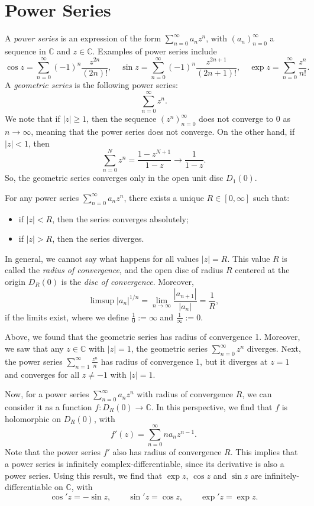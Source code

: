 \documentclass[a4paper, openany]{memoir}
\theoremstyle{definition}
\theoremstyle{plain}
\begin{document}
    \newpage

    \section{Power Series}
    A \emph{power series} is an expression of the form $\sum_{n=0}^\infty a_n z^n$, with $(a_n)_{n=0}^\infty$ a sequence in $\mathbb{C}$ and $z \in \mathbb{C}$. Examples of power series include
    \[\cos z = \sum_{n=0}^\infty (-1)^n \frac{z^{2n}}{(2n)!}, \quad \sin z = \sum_{n=0}^\infty (-1)^n \frac{z^{2n+1}}{(2n+1)!}, \quad \exp z = \sum_{n=0}^\infty \frac{z^n}{n!}.\]
    A \emph{geometric series} is the following power series:
    \[\sum_{n=0}^\infty z^n.\]
    We note that if $|z| \geq 1$, then the sequence $(z^n)_{n=0}^\infty$ does not converge to $0$ as $n \to \infty$, meaning that the power series does not converge. On the other hand, if $|z| < 1$, then
    \[\sum_{n=0}^N z^n = \frac{1 - z^{N+1}}{1 - z} \to \frac{1}{1 - z}.\]
    So, the geometric series converges only in the open unit disc $D_1(0)$. 
    
    For any power series $\sum_{n=0}^\infty a_n z^n$, there exists a unique $R \in [0, \infty]$ such that:
    \begin{itemize}
        \item if $|z| < R$, then the series converges absolutely;
        \item if $|z| > R$, then the series diverges.
    \end{itemize}
    In general, we cannot say what happens for all values $|z| = R$. This value $R$ is called the \emph{radius of convergence}, and the open disc of radius $R$ centered at the origin $D_R(0)$ is the \emph{disc of convergence}. Moreover,
    \[\limsup |a_n|^{1/n} = \lim_{n \to \infty} \frac{|a_{n+1}|}{|a_n|} = \frac{1}{R},\]
    if the limits exist, where we define $\frac{1}{0} := \infty$ and $\frac{1}{\infty} := 0$. 

    Above, we found that the geometric series has radius of convergence 1. Moreover, we saw that any $z \in \mathbb{C}$ with $|z| = 1$, the geometric series $\sum_{n=0}^\infty z^n$ diverges. Next, the power series $\sum_{n=1}^\infty \frac{z^n}{n}$ has radius of convergence 1, but it diverges at $z = 1$ and converges for all $z \neq -1$ with $|z| = 1$.

    Now, for a power series $\sum_{n=0}^\infty a_n z^n$ with radius of convergence $R$, we can consider it as a function $f \colon D_R(0) \to \mathbb{C}$. In this perspective, we find that $f$ is holomorphic on $D_R(0)$, with 
    \[f'(z) = \sum_{n=0}^\infty na_n z^{n-1}.\]
    Note that the power series $f'$ also has radius of convergence $R$. This implies that a power series is infinitely complex-differentiable, since its derivative is also a power series. Using this result, we find that $\exp z$, $\cos z$ and $\sin z$ are infinitely-differentiable on $\mathbb{C}$, with
    \[\cos' z = -\sin z, \qquad \sin' z = \cos z, \qquad \exp' z = \exp z.\]
\end{document}
